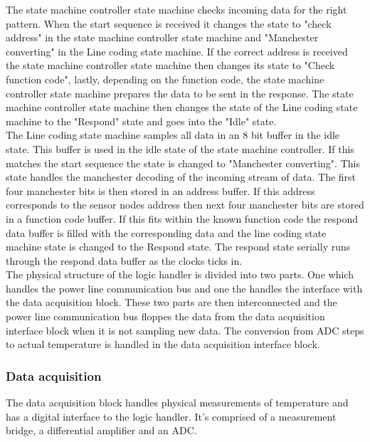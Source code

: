 The state machine controller state machine checks incoming data for the right pattern. When the start sequence is received it changes the state to "check address" in the state machine controller state machine and "Manchester converting" in the Line coding state machine. If the correct address is received the state machine controller state machine then changes its state to "Check function code", lastly, depending on the function code, the state machine controller state machine prepares the data to be sent in the response. The state machine controller state machine then changes the state of the Line coding state machine to the "Respond" state and goes into the "Idle" state.\\
The Line coding state machine samples all data in an 8 bit buffer in the idle state. This buffer is used in the idle state of the state machine controller. If this matches the start sequence the state is changed to "Manchester converting". This state handles the manchester decoding of the incoming stream of data. The first four manchester bits is then stored in an address buffer. If this address corresponds to the sensor nodes address then next four manchester bits are stored in a function code buffer. If this fits within the known function code the respond data buffer is filled with the corresponding data and the line coding state machine state is changed to the Respond state. The respond state serially runs through the respond data buffer as the clocks ticks in.\\

The physical structure of the logic handler is divided into two parts. One which handles the power line communication bus and one the handles the interface with the data acquisition block. These two parts are then interconnected and the power line communication bus floppes the data from the data acquisition interface block when it is not sampling new data. The conversion from ADC steps to actual temperature is handled in the data acquisition interface block.


\subsubsection{Data acquisition}

The data acquisition block handles physical measurements of temperature and has a digital interface to the logic handler. It's comprised of a measurement bridge, a differential amplifier and an ADC.

